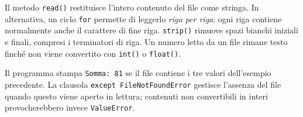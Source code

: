 Il metodo \texttt{read()} restituisce l'intero contenuto del file
come stringa. In alternativa, un ciclo \texttt{for} permette di leggerlo
\emph{riga per riga}; ogni riga contiene normalmente anche il
carattere di fine riga. \texttt{strip()} rimuove spazi bianchi iniziali
e finali, compresi i terminatori di riga. Un numero letto da un file
rimane testo finché non viene convertito con \texttt{int()} o
\texttt{float()}.



Il programma stampa \texttt{Somma: 81} se il file contiene i tre
valori dell'esempio precedente. La clausola
\texttt{except FileNotFoundError} gestisce l'assenza del file quando
questo viene aperto in lettura; contenuti non convertibili in interi
provocherebbero invece \texttt{ValueError}.
